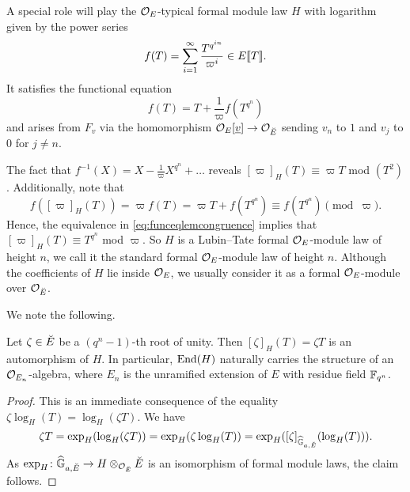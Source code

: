 \documentclass[../main.tex]{subfiles}
\begin{document}
A special role will play the $\mathcal{O}_E$-typical formal module law $H$
with logarithm given by the power series
\begin{equation*}
  f(T) = \sum_{i=1}^\infty \frac{T^{q^{in}}}{\varpi^i} \in E\llbracket T \rrbracket.
\end{equation*}
It satisfies the functional equation
\begin{equation*}
  f(T) = T + \frac 1\varpi f(T^{q^n})
\end{equation*}
and arises from $F_v$ via the homomorphism $\mathcal{O}_E[\underline v] \to \mathcal{O}_{\breve {E}}$
sending $v_n$ to $1$ and $v_j$ to $0$ for $j \neq n$. 

The fact that $f^{-1}(X) = X - \frac 1\varpi X^{q^n} + \dots$ reveals
$[\varpi]_H(T) \equiv \varpi T$ mod $(T^2)$. Additionally, note that 
\begin{equation*}
  f([\varpi]_H(T)) = \varpi f(T) = \varpi T + f(T^{q^n}) \equiv f(T^{q^n}) \pmod \varpi.
\end{equation*}
Hence, the equivalence in \eqref{eq:funceqlemcongruence} implies that 
$[\varpi]_H(T) \equiv T^{q^n}$ mod $\varpi$. So $H$ is a Lubin--Tate formal
$\mathcal{O}_E$-module law of height $n$, we call it the standard formal
$\mathcal{O}_E$-module law of height $n$. Although the coefficients of $H$ lie inside
$\mathcal{O}_E$,
we usually consider it as a formal $\mathcal{O}_E$-module over $\mathcal{O}_{\breve {E}}$.

We note the following. 
\begin{lem}\label{lem:MultByROUForStandardModule}
  Let $\zeta \in {\breve {E}}$ be a $(q^n-1)$-th root of unity. Then 
  $[\zeta]_H(T) = \zeta T$ is an automorphism of $H$. In particular,
  $\operatorname{End}(H)$ naturally carries the structure of an $\mathcal{O}_{E_n}$-algebra,
  where $E_n$ is the unramified extension of $E$ with residue field
  $\mathbb{F}_{q^n}$. 
\begin{proof}
  This is an immediate consequence of the equality $\zeta \log_H(T)
  = \log_H(\zeta T)$. We have
  \begin{equation*}
    \zeta T = \exp_H(\log_H(\zeta T)) = \exp_H(\zeta \log_H(T)) = \exp_H
    ([\zeta]_{\widehat{\mathbb{G}}_{a, {\breve {E}}}}(\log_H(T))).
  \end{equation*}
  As $\exp_H\colon  \widehat{\mathbb{G}}_{a, {\breve {E}}} \to H \otimes_{\mathcal{O}_{\breve {E}}} {\breve {E}}$ is an
  isomorphism of formal module laws, the claim follows.
\end{proof}
\end{lem}

\end{document}
